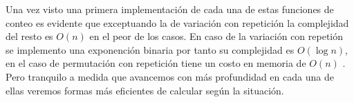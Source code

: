 Una vez visto una primera implementación de cada una de estas funciones de conteo es evidente que exceptuando la de variación con repetición la complejidad del resto es $O(n)$ en el peor de los casos. En caso de la variación con repetión se implemento una exponención binaria por tanto su complejidad es $O(\log n)$, en el caso de  permutación con repetición tiene un costo en memoria de $O(n)$ . Pero tranquilo a medida que avancemos con más profundidad en cada una de ellas veremos formas más eficientes de calcular según la situación.